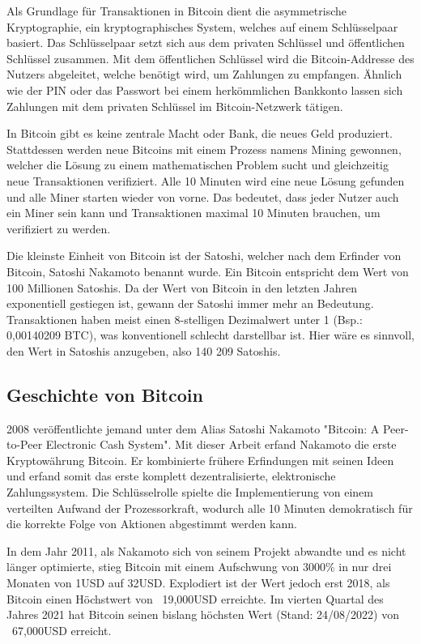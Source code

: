 Als Grundlage für Transaktionen in Bitcoin dient die asymmetrische Kryptographie, ein kryptographisches System, welches auf
einem Schlüsselpaar basiert. Das Schlüsselpaar setzt sich aus dem privaten Schlüssel und öffentlichen Schlüssel zusammen. Mit 
dem öffentlichen Schlüssel wird die Bitcoin-Addresse des Nutzers abgeleitet, welche benötigt wird, um Zahlungen zu empfangen. 
Ähnlich wie der PIN oder das Passwort bei einem herkömmlichen Bankkonto lassen sich Zahlungen mit dem privaten Schlüssel 
im Bitcoin-Netzwerk tätigen.

In Bitcoin gibt es keine zentrale Macht oder Bank, die neues Geld produziert. Stattdessen werden neue Bitcoins mit einem Prozess
namens Mining gewonnen, welcher die Lösung zu einem mathematischen Problem sucht und gleichzeitig neue Transaktionen verifiziert.
Alle 10 Minuten wird eine neue Lösung gefunden und alle Miner starten wieder von vorne. Das bedeutet, dass jeder Nutzer auch ein
Miner sein kann und Transaktionen maximal 10 Minuten brauchen, um verifiziert zu werden.

Die kleinste Einheit von Bitcoin ist der Satoshi, welcher nach dem Erfinder von Bitcoin, Satoshi Nakamoto benannt wurde. Ein 
Bitcoin entspricht dem Wert von 100 Millionen Satoshis. Da der Wert von Bitcoin in den letzten Jahren exponentiell gestiegen ist,
gewann der Satoshi immer mehr an Bedeutung. Transaktionen haben meist einen 8-stelligen Dezimalwert unter 1 (Bsp.: 0,00140209 BTC),
was konventionell schlecht darstellbar ist. Hier wäre es sinnvoll, den Wert in Satoshis anzugeben, also 140 209 Satoshis.


\subsection{Geschichte von Bitcoin}
2008 veröffentlichte jemand unter dem Alias Satoshi Nakamoto "Bitcoin: A Peer-to-Peer Electronic Cash System". 
Mit dieser Arbeit erfand Nakamoto die erste Kryptowährung Bitcoin. Er kombinierte frühere Erfindungen mit seinen Ideen und 
erfand somit das erste komplett dezentralisierte, elektronische Zahlungssystem. Die Schlüsselrolle spielte die Implementierung 
von einem verteilten Aufwand der Prozessorkraft, wodurch alle 10 Minuten demokratisch für die korrekte Folge von Aktionen 
abgestimmt werden kann.

In dem Jahr 2011, als Nakamoto sich von seinem Projekt abwandte und es nicht länger optimierte, stieg Bitcoin mit einem
Aufschwung von 3000\% in nur drei Monaten von 1USD auf 32USD. Explodiert ist der Wert jedoch erst 2018, als Bitcoin einen
Höchstwert von ~19,000USD erreichte. Im vierten Quartal des Jahres 2021 hat Bitcoin seinen bislang höchsten Wert (Stand: 24/08/2022)
von ~67,000USD erreicht.